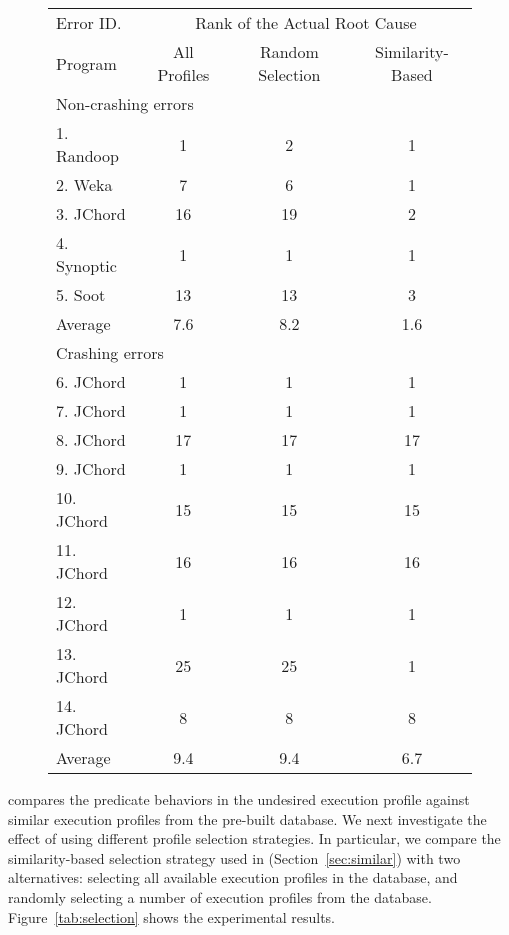 \begin{figure}[t]
\setlength{\tabcolsep}{.74\tabcolsep}
\small{
\begin{tabular}{|l|c|c||c|}
\hline
 Error ID. & \multicolumn{3}{|c|}{Rank of the Actual Root Cause} \\
\cline{2-4}
 Program & All Profiles& Random Selection&  Similarity-Based\\
 \hline
\hline
\multicolumn{4}{|l|}{Non-crashing errors}   \\
 \hline
 1. Randoop & 1 & 2 & 1\\
 2. Weka & 7 & 6 & 1\\
 3. JChord & 16 & 19 & 2\\
 4. Synoptic & 1 & 1 & 1\\
 5. Soot & 13 & 13 & 3\\
\hline
Average & 7.6 & 8.2 & 1.6 \\
\hline
\hline
\multicolumn{4}{|l|}{Crashing errors}   \\
\hline
 6. JChord & 1 & 1 &1\\
 7. JChord & 1 & 1 &1\\
 8. JChord & 17 & 17 &17\\
 9. JChord & 1 &  1&1\\
 10. JChord & 15 & 15 &15\\
 11. JChord & 16 & 16 &16\\
 12. JChord & 1 & 1 &1\\
 13. JChord & 25 & 25 &1\\
 14. JChord & 8 & 8 &8\\
\hline
Average & 9.4 & 9.4 & 6.7\\
\hline
\end{tabular}
}
\end{figure}


\ourtool compares the predicate behaviors in the undesired execution profile against
similar execution profiles from the pre-built database.
We next investigate the effect of using different profile selection strategies.
In particular, we compare the similarity-based selection strategy used in \ourtool
 (Section~\ref{sec:similar}) with two alternatives: selecting
all available execution profiles in the database, and
randomly selecting a number of execution profiles from the database.
Figure~\ref{tab:selection} shows the experimental results.

